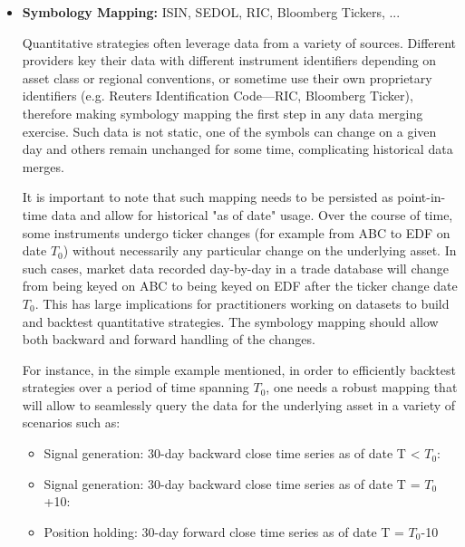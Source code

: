 \begin{itemize}
\item \textbf{Symbology Mapping:} ISIN, SEDOL, RIC, Bloomberg Tickers, ... 

Quantitative strategies often leverage data from a variety of sources. Different providers key their data with different instrument identifiers depending on asset class or regional conventions, or sometime use their own proprietary identifiers (e.g. Reuters Identification Code---RIC, Bloomberg Ticker), therefore making symbology mapping the first step in any data merging exercise. Such data is not static, one of the symbols can change on a given day and others remain unchanged for some time, complicating historical data merges.


It is important to note that such mapping needs to be persisted as point-in-time data and allow for historical "as of date" usage. Over the course of time, some instruments undergo ticker changes (for example from ABC to EDF on date $T_0$) without necessarily any particular change on the underlying asset. In such cases, market data recorded day-by-day in a trade database will change from being keyed on ABC to being keyed on EDF after the ticker change date $T_0$. This has large implications for practitioners working on datasets to build and backtest quantitative strategies. The symbology mapping should allow both backward and forward handling of the changes.


For instance, in the simple example mentioned, in order to efficiently backtest strategies over a period of time spanning $T_0$, one needs a robust mapping that will allow to seamlessly query the data for the underlying asset in a variety of scenarios such as:
\begin{itemize}
\item Signal generation: 30-day backward close time series as of date T < $T_0$:

\hspace*{-0.5cm}{\tt select close from data where date in [T-30,  T], sym=ABC}

\item Signal generation: 30-day backward close time series as of date T = $T_0$+10:

\hspace*{-0.5cm}{\tt select close from data where date in [$T_0$-20,  $T_0$+10], sym=EDF}

\item Position holding: 30-day forward close time series as of date T = $T_0$-10


\end{itemize}
\end{itemize}
